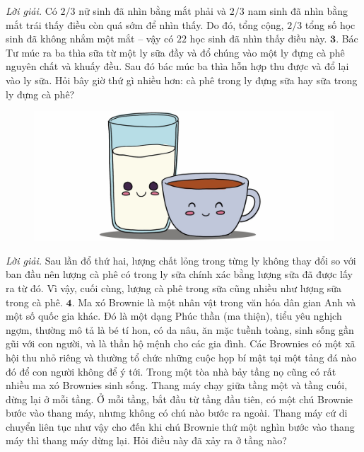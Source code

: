 \begin{multicols}{2}
\begin{figure}[H]
		\vspace*{-15pt}
	\end{figure}
	\textit{Lời giải.} Có $2/3$ nữ sinh đã nhìn bằng mắt phải và $2/3$ nam sinh đã nhìn bằng mắt trái thấy điều còn quá sớm để nhìn thấy. Do đó, tổng cộng, $2/3$ tổng số học sinh đã không nhắm  một mắt -- vậy có $22$ học sinh đã nhìn thấy điều này.
	\vskip 0.1cm
	$\pmb{3.}$ 	Bác Tư múc ra ba thìa sữa từ một ly sữa đầy và đổ chúng vào một ly đựng cà phê nguyên chất và khuấy đều. Sau đó bác múc ba thìa hỗn hợp thu được và đổ lại vào ly sữa. Hỏi bây giờ thứ gì nhiều hơn: cà phê trong ly đựng sữa hay sữa trong ly đựng cà phê?
	\begin{figure}[H]
		\centering
		\vspace*{5pt}
		\captionsetup{labelformat= empty, justification=centering}
		\includegraphics[width=1\linewidth]{Pi4_bai3}
		\vspace*{-15pt}
	\end{figure}
	\textit{Lời giải.} Sau lần đổ thứ hai, lượng chất lỏng trong từng ly không thay đổi so với ban đầu nên lượng cà phê  có  trong ly sữa chính xác bằng lượng sữa đã được lấy ra từ đó. Vì vậy, cuối cùng, lượng cà phê trong sữa cũng nhiều như lượng sữa trong cà phê.
	\vskip 0.1cm
	$\pmb{4.}$ Ma xó Brownie là một nhân vật trong văn hóa dân gian Anh và một số quốc gia khác. Đó là một dạng Phúc thần (ma thiện), tiểu yêu nghịch ngợm, thường mô tả là bé tí hon, có da nâu, ăn mặc tuềnh toàng, sinh sống gần gũi với con người, và là thần hộ mệnh cho các gia đình. Các Brownies có một xã hội thu nhỏ riêng và thường tổ chức những cuộc họp bí mật tại một tảng đá nào đó để con người không để ý tới. 
	\vskip 0.1cm
	Trong một tòa nhà bảy tầng nọ cũng có rất nhiều ma xó Brownies sinh sống. Thang máy chạy giữa tầng một và tầng cuối, dừng lại ở mỗi tầng. Ở mỗi tầng, bắt đầu từ tầng đầu tiên, có một chú Brownie bước vào thang máy, nhưng không có chú nào bước ra ngoài. Thang máy cứ di chuyển liên tục như vậy cho đến khi chú Brownie thứ một nghìn bước vào thang máy thì thang máy dừng lại. Hỏi điều này đã xảy ra ở tầng nào?

\end{multicols}
